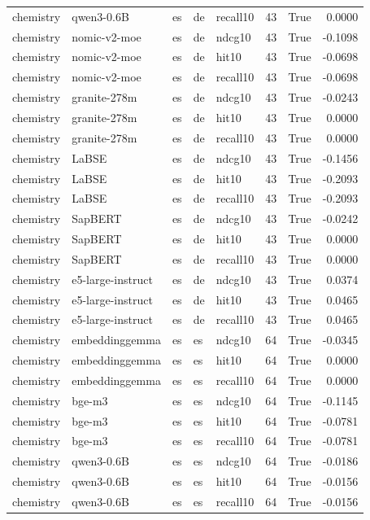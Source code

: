 \begin{tabular}{lllllrrr}
chemistry & qwen3-0.6B & es & de & recall10 & 43 & True & 0.0000 \\
chemistry & nomic-v2-moe & es & de & ndcg10 & 43 & True & -0.1098 \\
chemistry & nomic-v2-moe & es & de & hit10 & 43 & True & -0.0698 \\
chemistry & nomic-v2-moe & es & de & recall10 & 43 & True & -0.0698 \\
chemistry & granite-278m & es & de & ndcg10 & 43 & True & -0.0243 \\
chemistry & granite-278m & es & de & hit10 & 43 & True & 0.0000 \\
chemistry & granite-278m & es & de & recall10 & 43 & True & 0.0000 \\
chemistry & LaBSE & es & de & ndcg10 & 43 & True & -0.1456 \\
chemistry & LaBSE & es & de & hit10 & 43 & True & -0.2093 \\
chemistry & LaBSE & es & de & recall10 & 43 & True & -0.2093 \\
chemistry & SapBERT & es & de & ndcg10 & 43 & True & -0.0242 \\
chemistry & SapBERT & es & de & hit10 & 43 & True & 0.0000 \\
chemistry & SapBERT & es & de & recall10 & 43 & True & 0.0000 \\
chemistry & e5-large-instruct & es & de & ndcg10 & 43 & True & 0.0374 \\
chemistry & e5-large-instruct & es & de & hit10 & 43 & True & 0.0465 \\
chemistry & e5-large-instruct & es & de & recall10 & 43 & True & 0.0465 \\
chemistry & embeddinggemma & es & es & ndcg10 & 64 & True & -0.0345 \\
chemistry & embeddinggemma & es & es & hit10 & 64 & True & 0.0000 \\
chemistry & embeddinggemma & es & es & recall10 & 64 & True & 0.0000 \\
chemistry & bge-m3 & es & es & ndcg10 & 64 & True & -0.1145 \\
chemistry & bge-m3 & es & es & hit10 & 64 & True & -0.0781 \\
chemistry & bge-m3 & es & es & recall10 & 64 & True & -0.0781 \\
chemistry & qwen3-0.6B & es & es & ndcg10 & 64 & True & -0.0186 \\
chemistry & qwen3-0.6B & es & es & hit10 & 64 & True & -0.0156 \\
chemistry & qwen3-0.6B & es & es & recall10 & 64 & True & -0.0156 \\

\end{tabular}
